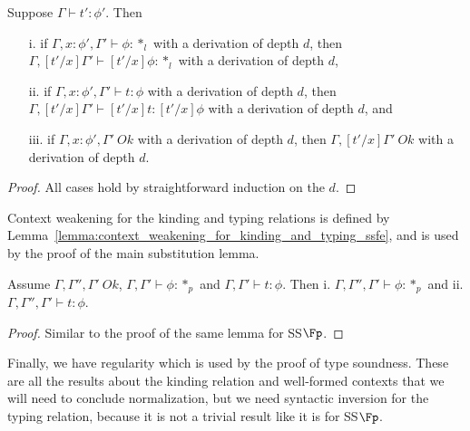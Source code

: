 \begin{lemma}
  \label{lemma:term_substitution_for_kinding_context_ok_ssfe}
  Suppose $\Gamma \vdash t':\phi'$.  Then
  \begin{itemize}
  \item[i.] if $\Gamma,x:\phi',\Gamma' \vdash \phi:*_l$ with a
    derivation of depth $d$, then $\Gamma,[t'/x]\Gamma' \vdash
    [t'/x]\phi:*_l$ with a derivation of depth $d$,
  \item[ii.] if $\Gamma, x:\phi',\Gamma' \vdash t:\phi$ with a 
    derivation of depth $d$, then $\Gamma,[t'/x]\Gamma' \vdash [t'/x]t:[t'/x]\phi$ 
    with a derivation of depth $d$, and
  \item[iii.] if $\Gamma,x:\phi',\Gamma'\ Ok$ with a derivation of depth $d$, then 
    $\Gamma,[t'/x]\Gamma'\ Ok$ with a derivation of depth $d$.
  \end{itemize}
\end{lemma}
\begin{proof}
  All cases hold by straightforward induction on the $d$.
\end{proof}
\noindent
Context weakening for the kinding and typing relations is defined by
Lemma~\ref{lemma:context_weakening_for_kinding_and_typing_ssfe}, and
is used by the proof of the main substitution lemma.

\begin{lemma}
  \label{lemma:context_weakening_for_kinding_and_typing_ssfe}
  Assume $\Gamma,\Gamma'',\Gamma'\ Ok$, $\Gamma,\Gamma' \vdash \phi:*_p$ and 
  $\Gamma,\Gamma' \vdash t:\phi$.  Then i. $\Gamma,\Gamma'',\Gamma' \vdash \phi:*_p$ and
  ii. $\Gamma,\Gamma'',\Gamma' \vdash t:\phi$. 
\end{lemma}
\begin{proof}
  Similar to the proof of the same lemma for SS$\Fp$.
\end{proof}
\noindent
Finally, we have regularity which is used by the proof of type
soundness.  These are all the results about the kinding relation and
well-formed contexts that we will need to conclude normalization, but
we need syntactic inversion for the typing relation, because it is not a 
trivial result like it is for SS$\Fp$.

